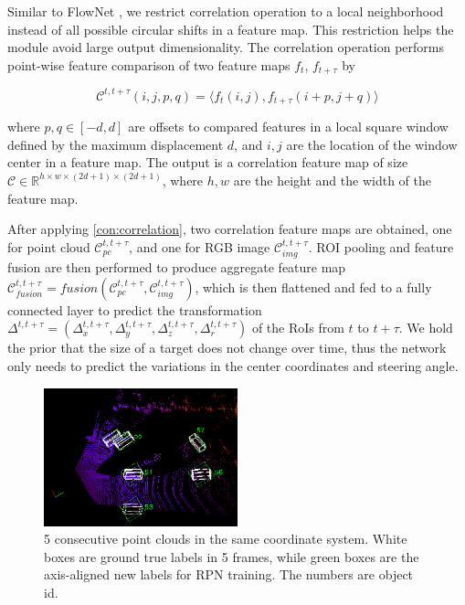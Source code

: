 \documentclass[letterpaper, 10 pt, conference]{ieeeconf}  %
\begin{document}
Similar to FlowNet \cite{dosovitskiy2015flownet}, we restrict correlation operation to a local neighborhood instead of all possible circular shifts in a feature map. This restriction helps the module avoid large output dimensionality. The correlation operation performs point-wise feature comparison of two feature maps $f_t$, $f_{t+\tau}$ by

\begin{equation}
\mathcal{C}^{t, t+\tau}(i, j, p, q) = \Big \langle f_t(i, j), f_{t+\tau} (i+p, j+q) \Big \rangle \label{con:correlation}
\end{equation}

where $p, q \in [-d, d]$ are offsets to compared features in a local square window defined by the maximum displacement $d$, and $i, j$ are the location of the window center in a feature map. The output is a correlation feature map of size $\mathcal{C} \in \mathbb{R}^{h \times w \times (2d+1) \times (2d+1)}$, where $h, w$ are the height and the width of the feature map.

After applying \eqref{con:correlation}, two correlation feature maps are obtained, one for point cloud $\mathcal{C}^{t, t+\tau}_{pc}$, and one for RGB image $\mathcal{C}^{t, t+\tau}_{img}$. ROI pooling and feature fusion are then performed to produce aggregate feature map $\mathcal{C}^{t,t+\tau}_{fusion} = fusion(\mathcal{C}^{t, t+\tau}_{pc}, \mathcal{C}^{t, t+\tau}_{img})$, which is then flattened and fed to a fully connected layer to predict the transformation $\Delta^{t, t+\tau} = (\Delta^{t,t+\tau}_{x}, \Delta^{t,t+\tau}_{y}, \Delta^{t,t+\tau}_{z}, \Delta^{t,t+\tau}_{r})$ of the RoIs from $t$ to $t+\tau$. We hold the prior that the size of a target does not change over time, thus the network only needs to predict the variations in the center coordinates and steering angle.

\begin{figure}
	\vspace{-0.6cm}
	\rule{0pt}{1ex}
	\begin{center}
		\includegraphics[width=0.5\textwidth]{images/integrated_boxes.png}
	\end{center}
	\caption{5 consecutive point clouds in the same coordinate system. White boxes are ground true labels in 5 frames, while green boxes are the axis-aligned new labels for RPN training. The numbers are object id.}
	\label{fig:integrated_boxes}
	\vspace{-0.5cm}
\end{figure}
\end{document}

